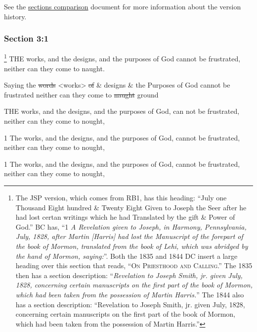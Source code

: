 		\medskip
		
		See the \href{https://drive.google.com/file/d/1goAvNz8jS4R8slYfMG_db55Ty2z_vmgK/view?usp=sharing}{sections comparison} document for more information about the version history.

	\subsubsection{Section 3:1} %
		\label{DC3-1}
		
			\footnote{%
				The JSP version, which comes from RB1, has this heading: ``July one Thousand Eight hundred \& Twenty Eight Given to Joseph the Seer after he had lost certan writings which he had Translated by the gift \& Power of God.'' BC has, ``1 \textit{A Revelation given to Joseph, in Harmony, Pennsylvania, July, 1828, after Martin [Harris] had lost the Manuscript of the forepart of the book of Mormon, translated from the book of Lehi, which was abridged by the hand of Mormon, saying:}''. Both the 1835 and 1844 DC insert a large heading over this section that reads, ``\textsc{On Priesthood and Calling}.'' The 1835 then has a section description: ``\textit{Revelation to Joseph Smith, jr. given July, 1828, concerning certain manuscripts on the first part of the book of Mormon, which had been taken from the possession of Martin Harris.}'' The 1844 also has a section description: ``Revelation to Joseph Smith, jr. given July, 1828, concerning certain manuscripts on the first part of the book of Mormon, which had been taken from the possession of Martin Harris.''
				}%
		THE works, and the designs, and the purposes of God cannot be frustrated, neither can they come to naught.

		\begin{framed}
		\scriptsize
			\begin{compactdesc}
				\item[JSP] Saying the \sout{words} <works> \sout{of} \& designs \& the Purposes of God cannot be frustrated neither can they come to \sout{naught} ground
				\item[BC] THE works, and the designs, and the purposes of God, can not be frustrated, neither can they come to nought,
				\item[DC 1835] 1 The works, and the designs, and the purposes of God, cannot be frustrated, neither can they come to nought,
				\item[DC 1844] 1 The works, and the designs, and the purposes of God, cannot be frustrated, neither can they come to nought,
			\end{compactdesc}
		\end{framed}

